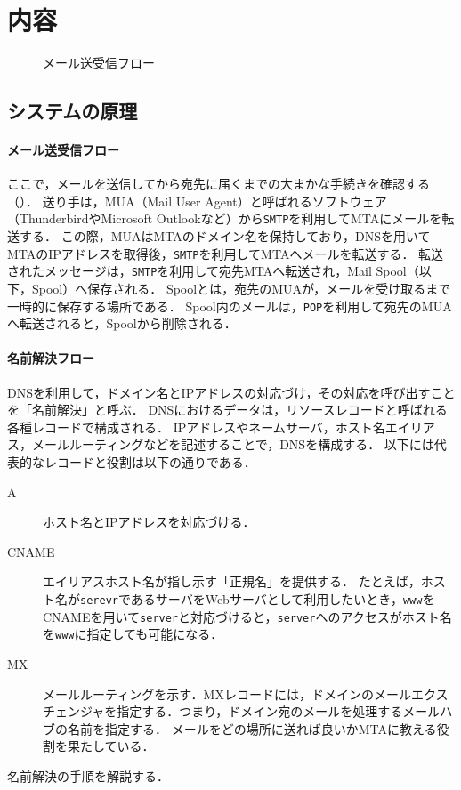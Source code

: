 \section{内容}
\begin{wrapfigure}{r}[0mm]{.48\textwidth}
    
    \caption{メール送受信フロー\footnotemark[1]}
    \label{fig:メール送受信フロー}
    \vspace{-1cm}
\end{wrapfigure}
\newcommand{\smtp}{\texttt{SMTP}}
\newcommand{\pop}{\texttt{POP}}
\newcommand{\imap}{\texttt{IMAP}}
\subsection{システムの原理}
\paragraph{メール送受信フロー}
ここで，メールを送信してから宛先に届くまでの大まかな手続きを確認する（）．
送り手は，MUA（Mail User Agent）と呼ばれるソフトウェア（ThunderbirdやMicrosoft Outlookなど）から\smtp を利用してMTAにメールを転送する．
この際，MUAはMTAのドメイン名を保持しており，DNSを用いてMTAのIPアドレスを取得後，\smtp を利用してMTAへメールを転送する．
転送されたメッセージは，\smtp を利用して宛先MTAへ転送され，Mail Spool（以下，Spool）へ保存される．
Spoolとは，宛先のMUAが，メールを受け取るまで一時的に保存する場所である．
Spool内のメールは，\pop を利用して宛先のMUAへ転送されると，Spoolから削除される．
\paragraph{名前解決フロー}
DNSを利用して，ドメイン名とIPアドレスの対応づけ，その対応を呼び出すことを「名前解決」と呼ぶ．
DNSにおけるデータは，リソースレコードと呼ばれる各種レコードで構成される．
IPアドレスやネームサーバ，ホスト名エイリアス，メールルーティングなどを記述することで，DNSを構成する\cite[p.88]{Postfix実用ガイド}．
以下には代表的なレコードと役割は以下の通りである．
\begin{oframed}
    \begin{description}
        \item[A] ホスト名とIPアドレスを対応づける．
        \item[CNAME] エイリアスホスト名が指し示す「正規名」を提供する．
            たとえば，ホスト名が\texttt{serevr}であるサーバをWebサーバとして利用したいとき，\texttt{www}をCNAMEを用いて\texttt{server}と対応づけると，\texttt{server}へのアクセスがホスト名を\texttt{www}に指定しても可能になる．
        \item[MX] メールルーティングを示す．MXレコードには，ドメインのメールエクスチェンジャを指定する．つまり，ドメイン宛のメールを処理するメールハブの名前を指定する．
            メールをどの場所に送れば良いかMTAに教える役割を果たしている．
    \end{description}
    \hfill\cite[p.88\ -\ p.89]{Postfix実用ガイド}
\end{oframed}
名前解決の手順を解説する．


